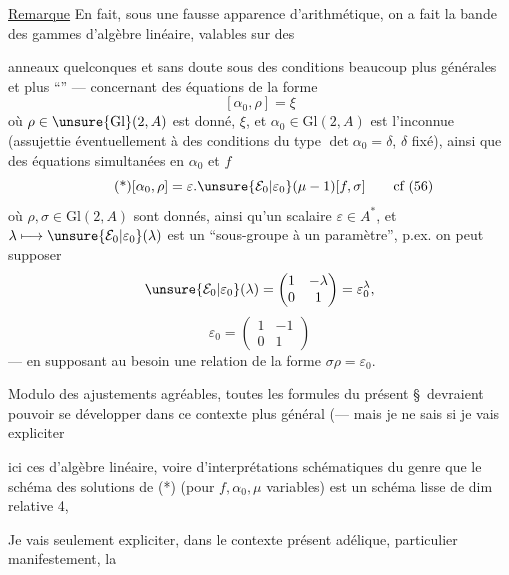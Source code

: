 \uline{Remarque} En fait, sous une fausse apparence d'arithmétique, on a fait  la bande des gammes d'algèbre linéaire, valables sur des



anneaux quelconques et  sans doute sous des conditions beaucoup plus générales et plus ``'' --- concernant des équations de la forme
\[
[\alpha_0,\rho]=\xi
\]
où $\rho\in\unsure{\mathrm{Gl}}(2,A)$ est donné,  $\xi$, et
$\alpha_0\in\mathrm{Gl}(2,A)$ est l'inconnue (assujettie éventuellement à des conditions du type $\det\alpha_0=\delta$, $\delta$ fixé), ainsi que des équations simultanées en $\alpha_0$ et $f$
\[
\tag{*}
[\alpha_0,\rho]=\varepsilon.\unsure{\mathcal{E}_0|\varepsilon_0}(\mu-1)[f,\sigma]
\qquad\text{cf (56)}
\]
où $\rho,\sigma\in\mathrm{Gl}(2,A)$ sont donnés, ainsi qu'un scalaire $\varepsilon\in A^*$, et
$\lambda\longmapsto\unsure{\mathcal{E}_0|\varepsilon_0}(\lambda)$ est un ``sous-groupe à un paramètre'', p.ex. on peut supposer
\[
\unsure{\mathcal{E}_0|\varepsilon_0}(\lambda)=\begin{pmatrix}1&-\lambda\\0&1\end{pmatrix}=\varepsilon_0^\lambda,
\]
\[
\varepsilon_0=\begin{pmatrix}1&-1\\0&1\end{pmatrix}
\]
--- en supposant au besoin une relation de la forme $\sigma\rho=\varepsilon_0$.

Modulo des ajustements agréables, toutes les formules du présent \S\ devraient pouvoir se développer dans ce contexte plus général
(--- mais je ne sais si je vais expliciter



ici ces   d'algèbre linéaire,
voire d'interprétations schématiques du genre que le schéma des solutions de (*)
(pour $f,\alpha_0,\mu$ variables) est un schéma  lisse de dim relative 4, 

Je vais seulement expliciter, dans le contexte présent adélique,  particulier manifestement, la

